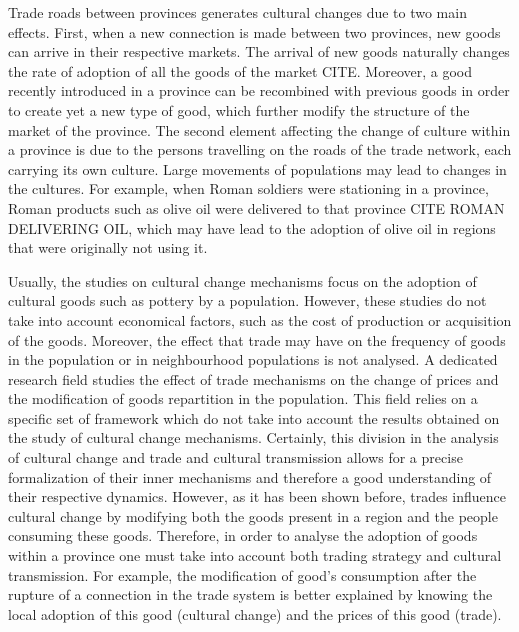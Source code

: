 \documentclass{wscpaperproc}
\begin{document}
Trade roads between provinces generates cultural changes due to two main effects. First, when a new connection is made between two provinces, new goods can arrive in their respective markets. The arrival of new goods naturally changes the rate of adoption of all the goods of the market CITE. Moreover, a good recently introduced in a province can be recombined with previous goods in order to create yet a new type of good, which further modify the structure of the market of the province. The second element affecting the change of culture within a province is due to the persons travelling on the roads of the trade network, each carrying its own culture. Large movements of populations may lead to changes in the cultures. For example, when Roman soldiers were stationing in a province, Roman products such as olive oil were delivered to that province CITE ROMAN DELIVERING OIL, which may have lead to the adoption of olive oil in regions that were originally not using it.


Usually, the studies on cultural change mechanisms focus on the adoption of cultural goods such as pottery by a population. However, these studies do not take into account economical factors, such as the cost of production or acquisition of the goods. Moreover, the effect that trade may have on the frequency of goods in the population or in neighbourhood populations is not analysed. A dedicated research field studies the effect of trade mechanisms on the change of prices and the modification of goods repartition in the population. This field relies on a specific set of framework which do not take into account the results obtained on the study of cultural change mechanisms. Certainly, this division in the analysis of cultural change and trade and cultural transmission allows for a precise formalization of their inner mechanisms and therefore a good understanding of their respective dynamics.
However, as it has been shown before, trades influence cultural change by modifying both the goods present in a region and the people consuming these goods.  Therefore, in order to analyse the adoption of goods within a province one must take into account both trading strategy and cultural transmission. For example, the modification of good's consumption after the rupture of a connection in the trade system is better explained by knowing the local adoption of this good (cultural change) and the prices of this good (trade).
\end{document}
